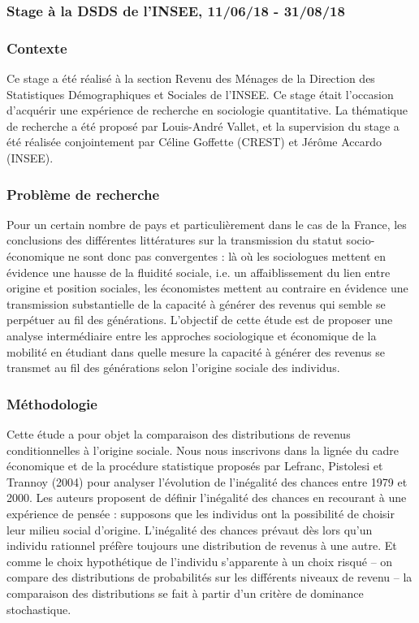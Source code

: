 

\subsubsection*{Stage à la DSDS de l'INSEE, 11/06/18 - 31/08/18}

\subsubsection*{Contexte}

Ce stage a été réalisé à la section Revenu des Ménages de la Direction des Statistiques Démographiques et Sociales de l'INSEE. Ce stage était l'occasion d'acquérir une expérience de recherche en sociologie quantitative. La thématique de recherche a été proposé par Louis-André Vallet, et la supervision du stage a été réalisée conjointement par Céline Goffette (CREST) et Jérôme Accardo (INSEE).

\subsubsection*{Problème de recherche}

Pour un certain nombre de pays et particulièrement dans le cas de la France, les conclusions des différentes littératures sur la transmission du statut socio-économique ne sont donc pas convergentes : là où les sociologues mettent en évidence une hausse de la fluidité sociale, i.e. un affaiblissement du lien entre origine et position sociales, les économistes mettent au contraire en évidence une transmission substantielle de la capacité à générer des revenus qui semble se perpétuer au fil des générations. L'objectif de cette étude est de proposer une analyse intermédiaire entre les approches sociologique et économique de la mobilité en étudiant dans quelle mesure la capacité à générer des revenus se transmet au fil des générations selon l'origine sociale des individus.

\subsubsection*{Méthodologie}

Cette étude a pour objet la comparaison des distributions de revenus conditionnelles à l'origine sociale. Nous nous inscrivons dans la lignée du cadre économique et de la procédure statistique proposés par Lefranc, Pistolesi et Trannoy (2004) pour analyser l'évolution de l'inégalité des chances entre 1979 et 2000. Les auteurs proposent de définir l'inégalité des chances en recourant à une expérience de pensée : supposons que les individus ont la possibilité de choisir leur milieu social d'origine. L'inégalité des chances prévaut dès lors qu'un individu rationnel préfère toujours une distribution de revenus à une autre. Et comme le choix hypothétique de l'individu s'apparente à un choix risqué -- on compare des distributions de probabilités sur les différents niveaux de revenu -- la comparaison des distributions se fait à partir d'un critère de dominance stochastique.

